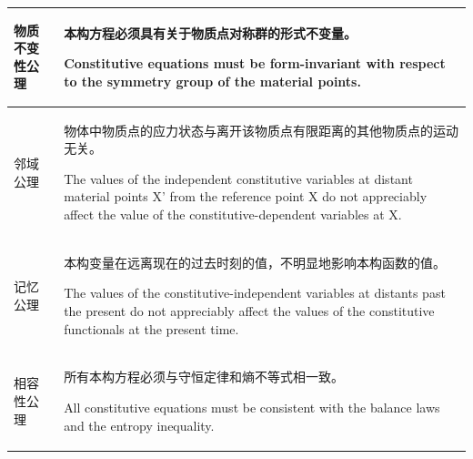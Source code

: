 \documentclass[12pt, a4paper, oneside, UTF8]{ctexbook}  %
\begin{document}
\begin{longtable}{|p{}|p{}|}
    物质不变性公理 & 
    本构方程必须具有关于物质点对称群的形式不变量。\par 
    Constitutive equations must be form-invariant with respect to the symmetry group of the material points. \\
    \hline
    
    邻域公理 & 
    物体中物质点的应力状态与离开该物质点有限距离的其他物质点的运动无关。\par
    The values of the independent constitutive variables at distant material points X' from the reference point X do not appreciably affect the value of the constitutive-dependent variables at X. \\
    \hline
    
    记忆公理 & 
    本构变量在远离现在的过去时刻的值，不明显地影响本构函数的值。\par
    The values of the constitutive-independent variables at distants past the present do not appreciably affect the values of the constitutive functionals at the present time. \\
    \hline
    
    相容性公理 & 
    所有本构方程必须与守恒定律和熵不等式相一致。\par
    All constitutive equations must be consistent with the balance laws and the entropy inequality. \\
    \hline
\end{longtable}
\end{document}

